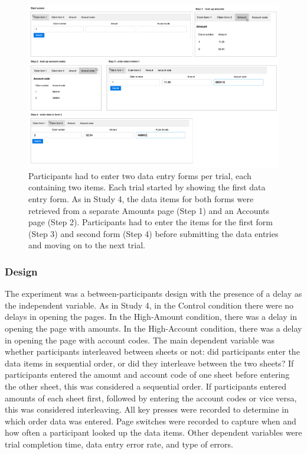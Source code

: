 \begin{figure}
\includegraphics[width=\textwidth]{images/ch34/ch34-5_Tasksequence.pdf}
    \caption{Participants had to enter two data entry forms per trial, each containing two items. Each trial started by showing the first data entry form. As in Study 4, the data items for both forms were retrieved from a separate Amounts page (Step 1) and an Accounts page (Step 2). Participants had to enter the items for the first form (Step 3) and second form (Step 4) before submitting the data entries and moving on to the next trial.}\label{fig:ch34_5-tasklayout}
\end{figure}

\subsubsection{Design}

The experiment was a between-participants design with the presence of a delay as the independent variable. As in Study 4, in the Control condition there were no delays in opening the pages. In the High-Amount condition, there was a delay in opening the page with amounts. In the High-Account condition, there was a delay in opening the page with account codes. The main dependent variable was whether participants interleaved between sheets or not: did participants enter the data items in sequential order, or did they interleave between the two sheets? If participants entered the amount and account code of one sheet before entering the other sheet, this was considered a sequential order. If participants entered amounts of each sheet first, followed by entering the account codes or vice versa, this was considered interleaving. All key presses were recorded to determine in which order data was entered. Page switches were recorded to capture when and how often a participant looked up the data items. Other dependent variables were trial completion time, data entry error rate, and type of errors.

